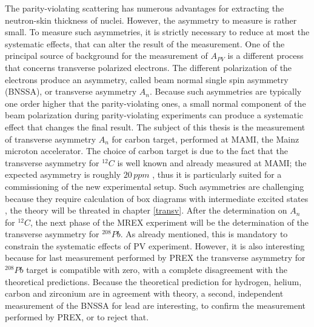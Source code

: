 The parity-violating scattering has numerous advantages for extracting the neutron-skin thickness of nuclei. However, the asymmetry to measure is rather small. To measure such asymmetries, it is strictly necessary to reduce at most the systematic effects, that can alter the result of the measurement. One of the principal source of background for the measurement of $A_{PV}$ is a different process that concerns transverse polarized electrons. The different polarization of the electrons produce an asymmetry, called beam normal single spin asymmetry (BNSSA), or transverse asymmetry $A_{n}$. Because such asymmetries are typically one order higher that the parity-violating ones, a small normal component of the beam polarization during parity-violating experiments can produce a systematic effect that changes the final result. The subject of this thesis is the measurement of transverse asymmetry $A_{n}$ for carbon target, performed at MAMI, the Mainz microton accelerator. The choice of carbon target is due to the fact that the transverse asymmetry for $^{12}C$ is well known and already measured at MAMI; the expected asymmetry is roughly $20 \, ppm$ , thus it is particularly suited for a commissioning of the new experimental setup. Such asymmetries are challenging because they require calculation of box diagrams with intermediate excited states \cite{Gorchtein_2008}, the theory will be threated in chapter \ref{transv}. After the determination on $A_{n}$ for $^{12}C$, the next phase of the MREX experiment will be the determination of the transverse asymmetry for $^{208}Pb$. As already mentioned, this is mandatory to constrain the systematic effects of PV experiment. However, it is also interesting because for last measurement performed by PREX \cite{HAPPEX:2012fud} the transverse asymmetry for $^{208}Pb$ target is compatible with zero, with a complete disagreement with the theoretical predictions. Because the theoretical prediction for hydrogen, helium, carbon and zirconium are in agreement with theory, a second, independent measurement of the BNSSA for lead are interesting, to confirm the measurement performed by PREX, or to reject that.  
